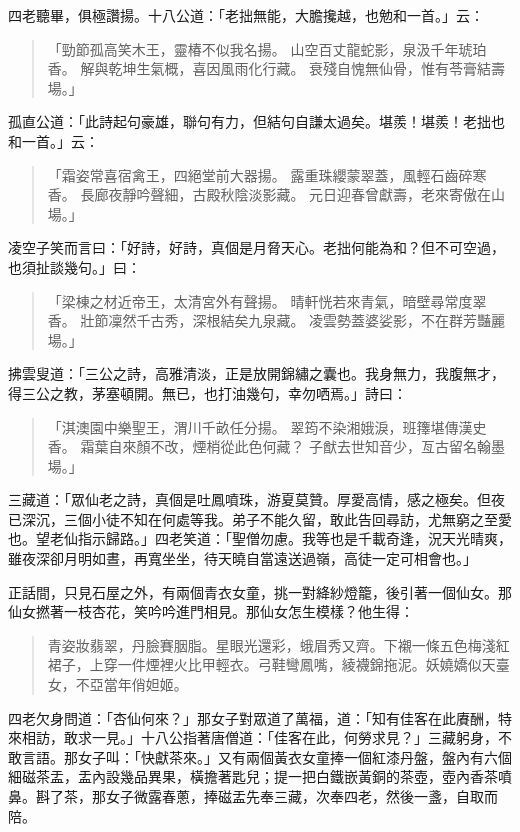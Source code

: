四老聽畢，俱極讚揚。十八公道：「老拙無能，大膽攙越，也勉和一首。」云：
\begin{quote}
「勁節孤高笑木王，靈椿不似我名揚。
山空百丈龍蛇影，泉汲千年琥珀香。
解與乾坤生氣概，喜因風雨化行藏。
衰殘自愧無仙骨，惟有苓膏結壽場。」
\end{quote}

孤直公道：「此詩起句豪雄，聯句有力，但結句自謙太過矣。堪羨！堪羨！老拙也和一首。」云：
\begin{quote}
「霜姿常喜宿禽王，四絕堂前大器揚。
露重珠纓蒙翠蓋，風輕石齒碎寒香。
長廊夜靜吟聲細，古殿秋陰淡影藏。
元日迎春曾獻壽，老來寄傲在山場。」
\end{quote}

凌空子笑而言曰：「好詩，好詩，真個是月脅天心。老拙何能為和？但不可空過，也須扯談幾句。」曰：
\begin{quote}
「梁棟之材近帝王，太清宮外有聲揚。
晴軒恍若來青氣，暗壁尋常度翠香。
壯節凜然千古秀，深根結矣九泉藏。
凌雲勢蓋婆娑影，不在群芳豔麗場。」
\end{quote}

拂雲叟道：「三公之詩，高雅清淡，正是放開錦繡之囊也。我身無力，我腹無才，得三公之教，茅塞頓開。無已，也打油幾句，幸勿哂焉。」詩曰：
\begin{quote}
「淇澳園中樂聖王，渭川千畝任分揚。
翠筠不染湘娥淚，班籜堪傳漢史香。
霜葉自來顏不改，煙梢從此色何藏？
子猷去世知音少，亙古留名翰墨場。」
\end{quote}

三藏道：「眾仙老之詩，真個是吐鳳噴珠，游夏莫贊。厚愛高情，感之極矣。但夜已深沉，三個小徒不知在何處等我。弟子不能久留，敢此告回尋訪，尤無窮之至愛也。望老仙指示歸路。」四老笑道：「聖僧勿慮。我等也是千載奇逢，況天光晴爽，雖夜深卻月明如晝，再寬坐坐，待天曉自當遠送過嶺，高徒一定可相會也。」

正話間，只見石屋之外，有兩個青衣女童，挑一對絳紗燈籠，後引著一個仙女。那仙女撚著一枝杏花，笑吟吟進門相見。那仙女怎生模樣？他生得：
\begin{quote}
青姿妝翡翠，丹臉賽胭脂。星眼光還彩，蛾眉秀又齊。下襯一條五色梅淺紅裙子，上穿一件煙裡火比甲輕衣。弓鞋彎鳳嘴，綾襪錦拖泥。妖嬈嬌似天臺女，不亞當年俏妲姬。
\end{quote}

四老欠身問道：「杏仙何來？」那女子對眾道了萬福，道：「知有佳客在此賡酬，特來相訪，敢求一見。」十八公指著唐僧道：「佳客在此，何勞求見？」三藏躬身，不敢言語。那女子叫：「快獻茶來。」又有兩個黃衣女童捧一個紅漆丹盤，盤內有六個細磁茶盂，盂內設幾品異果，橫擔著匙兒；提一把白鐵嵌黃銅的茶壺，壺內香茶噴鼻。斟了茶，那女子微露春蔥，捧磁盂先奉三藏，次奉四老，然後一盞，自取而陪。


